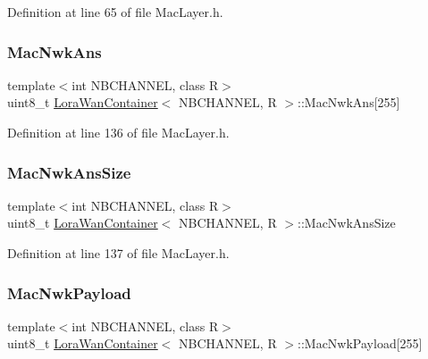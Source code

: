 Definition at line 65 of file Mac\+Layer.\+h.

\mbox{\label{class_lora_wan_container_ac1ae71177292139650127c17088a6337}} 
\subsubsection{\texorpdfstring{Mac\+Nwk\+Ans}{MacNwkAns}}
{\footnotesize\ttfamily template$<$int N\+B\+C\+H\+A\+N\+N\+EL, class R$>$ \\
uint8\+\_\+t \mbox{\hyperlink{class_lora_wan_container}{Lora\+Wan\+Container}}$<$ N\+B\+C\+H\+A\+N\+N\+EL, R $>$\+::Mac\+Nwk\+Ans\mbox{[}255\mbox{]}}



Definition at line 136 of file Mac\+Layer.\+h.

\mbox{\label{class_lora_wan_container_a76713cb99312f54ec3bf3057c2a0e798}} 
\subsubsection{\texorpdfstring{Mac\+Nwk\+Ans\+Size}{MacNwkAnsSize}}
{\footnotesize\ttfamily template$<$int N\+B\+C\+H\+A\+N\+N\+EL, class R$>$ \\
uint8\+\_\+t \mbox{\hyperlink{class_lora_wan_container}{Lora\+Wan\+Container}}$<$ N\+B\+C\+H\+A\+N\+N\+EL, R $>$\+::Mac\+Nwk\+Ans\+Size}



Definition at line 137 of file Mac\+Layer.\+h.

\mbox{\label{class_lora_wan_container_a1aa41109a8f67940d645666709a3c12b}} 
\subsubsection{\texorpdfstring{Mac\+Nwk\+Payload}{MacNwkPayload}}
{\footnotesize\ttfamily template$<$int N\+B\+C\+H\+A\+N\+N\+EL, class R$>$ \\
uint8\+\_\+t \mbox{\hyperlink{class_lora_wan_container}{Lora\+Wan\+Container}}$<$ N\+B\+C\+H\+A\+N\+N\+EL, R $>$\+::Mac\+Nwk\+Payload\mbox{[}255\mbox{]}}



